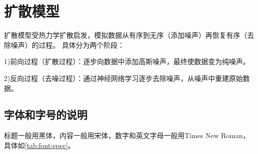 \section{扩散模型}
扩散模型受热力学扩散启发，模拟数据从有序到无序（添加噪声）再恢复有序（去除噪声）的过程。
\cite{ho2020denoising}
具体分为两个阶段：

1)前向过程（扩散过程）：逐步向数据中添加高斯噪声，最终使数据变为纯噪声。

2)反向过程（去噪过程）：通过神经网络学习逐步去除噪声，从噪声中重建原始数据。

\subsection{字体和字号的说明}

标题一般用黑体，内容一般用宋体，数字和英文字母一般用Times New Roman，具体如\autoref{tab:font-spec}。

